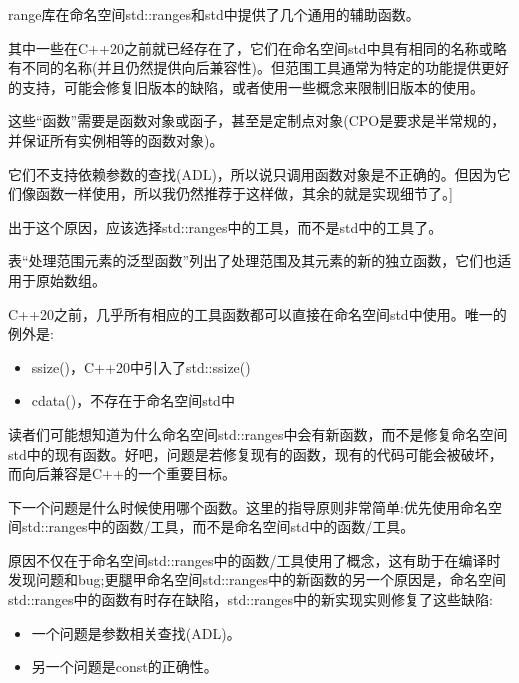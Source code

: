
range库在命名空间std::ranges和std中提供了几个通用的辅助函数。

其中一些在C++20之前就已经存在了，它们在命名空间std中具有相同的名称或略有不同的名称(并且仍然提供向后兼容性)。但范围工具通常为特定的功能提供更好的支持，可能会修复旧版本的缺陷，或者使用一些概念来限制旧版本的使用。

这些“函数”需要是函数对象或函子，甚至是定制点对象(CPO是要求是半常规的，并保证所有实例相等的函数对象)。

它们不支持依赖参数的查找(ADL)，所以说只调用函数对象是不正确的。但因为它们像函数一样使用，所以我仍然推荐于这样做，其余的就是实现细节了。]

出于这个原因，应该选择std::ranges中的工具，而不是std中的工具了。


表“处理范围元素的泛型函数”列出了处理范围及其元素的新的独立函数，它们也适用于原始数组。

C++20之前，几乎所有相应的工具函数都可以直接在命名空间std中使用。唯一的例外是:

\begin{itemize}
\item
ssize()，C++20中引入了std::ssize()

\item
cdata()，不存在于命名空间std中
\end{itemize}

读者们可能想知道为什么命名空间std::ranges中会有新函数，而不是修复命名空间std中的现有函数。好吧，问题是若修复现有的函数，现有的代码可能会被破坏，而向后兼容是C++的一个重要目标。

下一个问题是什么时候使用哪个函数。这里的指导原则非常简单:优先使用命名空间std::ranges中的函数/工具，而不是命名空间std中的函数/工具。

原因不仅在于命名空间std::ranges中的函数/工具使用了概念，这有助于在编译时发现问题和bug;更腿甲命名空间std::ranges中的新函数的另一个原因是，命名空间std::ranges中的函数有时存在缺陷，std::ranges中的新实现实则修复了这些缺陷:

\begin{itemize}
\item
一个问题是参数相关查找(ADL)。

\item
另一个问题是const的正确性。
\end{itemize}


